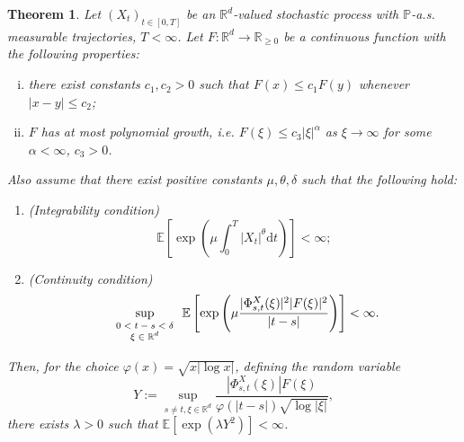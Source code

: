 \documentclass[10pt]{article}
\newcommand{\assign}{:=}
\newcommand{\mathd}{\mathrm{d}}
\newcommand{\tmscript}[1]{\text{\scriptsize{$#1$}}}
\newenvironment{enumerateroman}{\begin{enumerate}[i.] }{\end{enumerate}}
\newtheorem{theorem}{Theorem}
\begin{document}
\begin{theorem}
  \label{sec4.1 thm general criterion}Let $(X_t)_{t \in [0, T]}$ be an
  $\mathbb{R}^d$\mbox{-}valued stochastic process with $\mathbb{P}$-a.s.
  measurable trajectories, $T < \infty$. Let $F : \mathbb{R}^d \rightarrow
  \mathbb{R}_{\geqslant 0}$ be a continuous function with the following
  properties:
  \begin{enumerateroman}
    \item there exist constants $c_1, c_2 > 0$ such that $F (x) \leqslant c_1
    F (y)$ whenever $| x - y | \leqslant c_2$;
    
    \item $F$ has at most polynomial growth, i.e. $F (\xi) \leqslant c_3 | \xi
    |^{\alpha}$ as $\xi \rightarrow \infty$ for some $\alpha < \infty$, $c_3 >
    0$.
  \end{enumerateroman}
  Also assume that there exist positive constants $\mu, \theta, \delta$ such
  that the following hold:
  \begin{enumerate}
    \item (Integrability condition)
    \begin{equation}
      \mathbb{E} \left[ \exp \left( \mu \int_0^T | X_t |^{\theta} \mathd t
      \right) \right] < \infty \label{sec4.1 general criterion integrability}
      ;
    \end{equation}
    \item (Continuity condition)
    \begin{equation}
      \sup_{\tmscript{\begin{array}{c}
        0 < t - s < \delta\\
        \xi \in \mathbb{R}^d
      \end{array}}} \mathbb{E} \left[ \exp \left( \mu \frac{| \Phi^X_{s, t}
      (\xi) |^2  | F (\xi) |^2}{| t - s |} \right) \right] < \infty
      \label{sec4.1 general criterion continuity} .
    \end{equation}
  \end{enumerate}
  Then, for the choice $\varphi (x) = \sqrt{x | \log x |}$, defining the
  random variable
  \[ Y \assign \sup_{s \neq t, \xi \in \mathbb{R}^d} \frac{| \Phi^X_{s, t}
     (\xi) | F (\xi)}{\varphi (| t - s |) \sqrt{\log | \xi |}}, \]
  there exists $\lambda > 0$ such that $\mathbb{E} [\exp (\lambda Y^2)] <
  \infty$.
\end{theorem}
\end{document}
